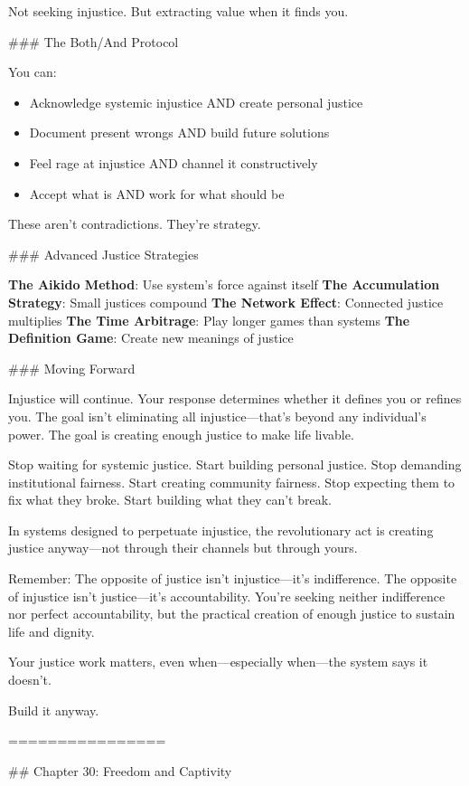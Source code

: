 \documentclass[12pt]{book}
\begin{document}
Not seeking injustice. But extracting value when it finds you.

\#\#\# The Both/And Protocol

You can:
\begin{itemize}
\item Acknowledge systemic injustice AND create personal justice
\item Document present wrongs AND build future solutions
\item Feel rage at injustice AND channel it constructively
\item Accept what is AND work for what should be

\end{itemize}
These aren't contradictions. They're strategy.

\#\#\# Advanced Justice Strategies

\textbf{The Aikido Method}: Use system's force against itself
\textbf{The Accumulation Strategy}: Small justices compound
\textbf{The Network Effect}: Connected justice multiplies
\textbf{The Time Arbitrage}: Play longer games than systems
\textbf{The Definition Game}: Create new meanings of justice

\#\#\# Moving Forward

Injustice will continue. Your response determines whether it defines you or refines you. The goal isn't eliminating all injustice—that's beyond any individual's power. The goal is creating enough justice to make life livable.

Stop waiting for systemic justice. Start building personal justice. Stop demanding institutional fairness. Start creating community fairness. Stop expecting them to fix what they broke. Start building what they can't break.

In systems designed to perpetuate injustice, the revolutionary act is creating justice anyway—not through their channels but through yours.

Remember: The opposite of justice isn't injustice—it's indifference. The opposite of injustice isn't justice—it's accountability. You're seeking neither indifference nor perfect accountability, but the practical creation of enough justice to sustain life and dignity.

Your justice work matters, even when—especially when—the system says it doesn't.

Build it anyway.

================

\#\# Chapter 30: Freedom and Captivity
\end{document}

